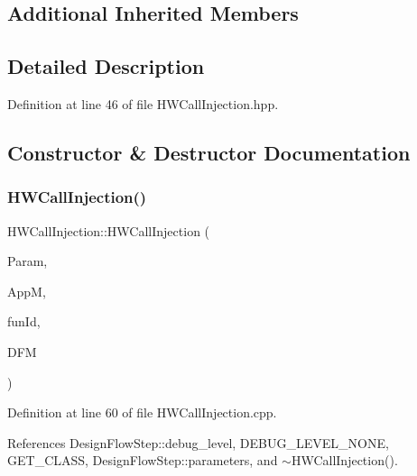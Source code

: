 \subsection*{Additional Inherited Members}


\subsection{Detailed Description}


Definition at line 46 of file H\+W\+Call\+Injection.\+hpp.



\subsection{Constructor \& Destructor Documentation}
\mbox{\label{classHWCallInjection_aef59f1a3976f0b57603584279d628446}} 
\subsubsection{\texorpdfstring{H\+W\+Call\+Injection()}{HWCallInjection()}}
{\footnotesize\ttfamily H\+W\+Call\+Injection\+::\+H\+W\+Call\+Injection (\begin{DoxyParamCaption}\item[{const \hyperlink{Parameter_8hpp_a37841774a6fcb479b597fdf8955eb4ea}{Parameter\+Const\+Ref}}]{Param,  }\item[{const \hyperlink{application__manager_8hpp_a04ccad4e5ee401e8934306672082c180}{application\+\_\+manager\+Ref}}]{AppM,  }\item[{unsigned int}]{fun\+Id,  }\item[{const Design\+Flow\+Manager\+Const\+Ref}]{D\+FM }\end{DoxyParamCaption})}



Definition at line 60 of file H\+W\+Call\+Injection.\+cpp.



References Design\+Flow\+Step\+::debug\+\_\+level, D\+E\+B\+U\+G\+\_\+\+L\+E\+V\+E\+L\+\_\+\+N\+O\+NE, G\+E\+T\+\_\+\+C\+L\+A\+SS, Design\+Flow\+Step\+::parameters, and $\sim$\+H\+W\+Call\+Injection().

